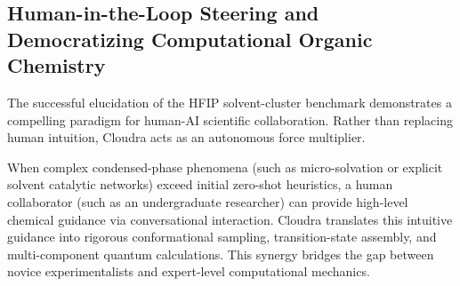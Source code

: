 \documentclass[10pt,twocolumn,letterpaper]{article}
\begin{document}
\subsection{Human-in-the-Loop Steering and Democratizing Computational Organic Chemistry}
The successful elucidation of the HFIP solvent-cluster benchmark demonstrates a compelling paradigm for human-AI scientific collaboration. Rather than replacing human intuition, Cloudra acts as an autonomous force multiplier.

When complex condensed-phase phenomena (such as micro-solvation or explicit solvent catalytic networks) exceed initial zero-shot heuristics, a human collaborator (such as an undergraduate researcher) can provide high-level chemical guidance via conversational interaction. Cloudra translates this intuitive guidance into rigorous conformational sampling, transition-state assembly, and multi-component quantum calculations. This synergy bridges the gap between novice experimentalists and expert-level computational mechanics.
\end{document}
